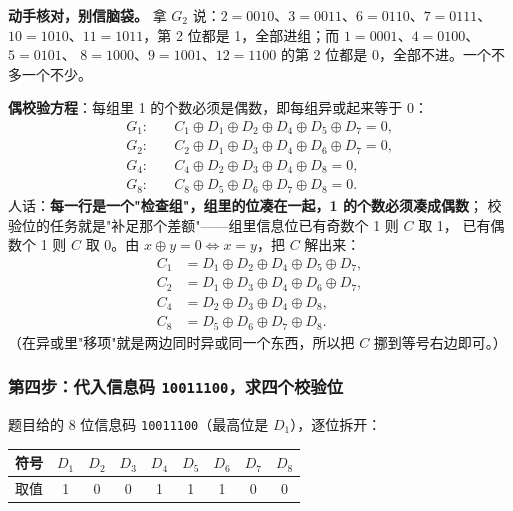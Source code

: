 \textbf{动手核对，别信脑袋。} 拿 $G_2$ 说：$2=0010$、$3=0011$、$6=0110$、$7=0111$、
$10=1010$、$11=1011$，第 2 位都是 1，全部进组；而 $1=0001$、$4=0100$、$5=0101$、
$8=1000$、$9=1001$、$12=1100$ 的第 2 位都是 0，全部不进。一个不多一个不少。

\textbf{偶校验方程}：每组里 1 的个数必须是偶数，即每组异或起来等于 0：
\begin{align*}
G_1:\quad & C_1\oplus D_1\oplus D_2\oplus D_4\oplus D_5\oplus D_7=0,\\
G_2:\quad & C_2\oplus D_1\oplus D_3\oplus D_4\oplus D_6\oplus D_7=0,\\
G_4:\quad & C_4\oplus D_2\oplus D_3\oplus D_4\oplus D_8=0,\\
G_8:\quad & C_8\oplus D_5\oplus D_6\oplus D_7\oplus D_8=0 .
\end{align*}
人话：\textbf{每一行是一个"检查组"，组里的位凑在一起，1 的个数必须凑成偶数}；
校验位的任务就是"补足那个差额"——组里信息位已有奇数个 1 则 $C$ 取 1，
已有偶数个 1 则 $C$ 取 0。由 $x\oplus y=0\Leftrightarrow x=y$，把 $C$ 解出来：
\begin{align*}
C_1&=D_1\oplus D_2\oplus D_4\oplus D_5\oplus D_7,\\
C_2&=D_1\oplus D_3\oplus D_4\oplus D_6\oplus D_7,\\
C_4&=D_2\oplus D_3\oplus D_4\oplus D_8,\\
C_8&=D_5\oplus D_6\oplus D_7\oplus D_8 .
\end{align*}
（在异或里"移项"就是两边同时异或同一个东西，所以把 $C$ 挪到等号右边即可。）

\subsubsection{第四步：代入信息码 \texttt{10011100}，求四个校验位}

题目给的 8 位信息码 \texttt{10011100}（最高位是 $D_1$），逐位拆开：

\begin{center}\small
\setlength{\tabcolsep}{6pt}
\begin{tabular}{@{}lcccccccc@{}}
\toprule
符号 & $D_1$ & $D_2$ & $D_3$ & $D_4$ & $D_5$ & $D_6$ & $D_7$ & $D_8$\\
\midrule
取值 & 1 & 0 & 0 & 1 & 1 & 1 & 0 & 0\\
\bottomrule
\end{tabular}
\end{center}

